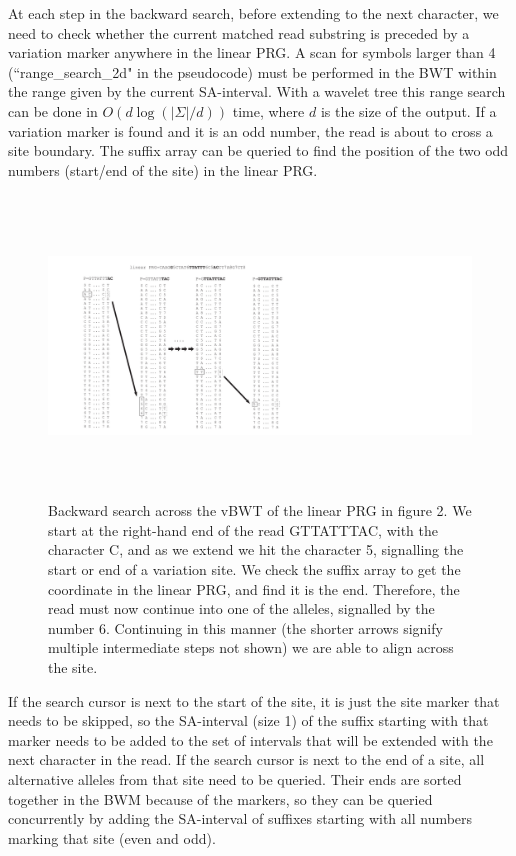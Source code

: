 \documentclass[runningheads,a4paper]{llncs}
\begin{document}
At each step in the backward search, before extending to the next character, we need to check whether the current matched read substring is preceded by a variation marker anywhere in the linear PRG. A scan for symbols larger than 4 (``range\_search\_2d" in the pseudocode) must be performed in the BWT within the range given by the current SA-interval. With a wavelet tree this range search can be done in $O(d\log(|\Sigma|/d))$ time, where $d$ is the size of the output. If a variation marker is found and it is an odd number, the read is about to cross a site boundary. The suffix array can be queried to find the position of the two odd numbers (start/end of the site) in the linear PRG.



\begin{figure}
\centering
\includegraphics[height=8cm]{BWT.pdf}
\caption{Backward search across the vBWT of the linear PRG in figure 2.  We start at the right-hand end of the read GTTATTTAC, with the character C, and as we extend we hit the character 5, signalling the start or end of a variation site. We check the suffix array to get the coordinate in the linear PRG, and find it is the end. Therefore, the read must now continue into one of the alleles, signalled by the number 6. Continuing in this manner (the shorter arrows signify multiple intermediate steps not shown) we are able to align across the site.}
\label{example}
\end{figure}


If the search cursor is next to the start of the site, it is just the site marker that needs to be skipped, so the SA-interval (size 1) of the suffix starting with that marker needs to be added to the set of intervals that will be extended with the next character in the read. If the search cursor is next to the end of a site, all alternative alleles from that site need to be queried. Their ends are sorted together in the BWM because of the markers, so they can be queried concurrently by adding the SA-interval of suffixes starting with all numbers marking that site (even and odd). 
\end{document}
